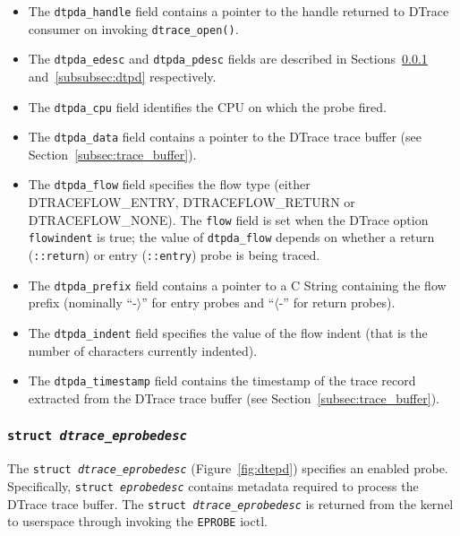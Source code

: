 \begin{itemize}

	\item The \texttt{dtpda\_handle} field contains a pointer to the handle
returned to DTrace consumer on invoking \texttt{dtrace\_open()}.

	\item The \texttt{dtpda\_edesc} and \texttt{dtpda\_pdesc} fields are
described in Sections~\ref{subsubsec:dtepd} and~\ref{subsubsec:dtpd}
respectively.

	\item The \texttt{dtpda\_cpu} field identifies the CPU on which the
probe fired.

	\item The \texttt{dtpda\_data} field contains a pointer to the DTrace
trace buffer (see Section~\ref{subsec:trace_buffer}).

	\item The \texttt{dtpda\_flow} field specifies the flow type (either
DTRACEFLOW\_ENTRY, DTRACEFLOW\_RETURN or DTRACEFLOW\_NONE). The \texttt{flow}
field is set when the DTrace option \texttt{flowindent} is true; the value of
\texttt{dtpda\_flow} depends on whether a return (\texttt{::return}) or entry
(\texttt{::entry}) probe is being traced.

	\item The \texttt{dtpda\_prefix} field contains a pointer to a C String
containing the flow prefix (nominally ``-$\rangle$'' for entry probes and
``$\langle$-'' for return probes).

	\item The \texttt{dtpda\_indent} field specifies the value of the flow
indent (that is the number of characters currently indented).

	\item The \texttt{dtpda\_timestamp} field contains the timestamp of the
trace record extracted from the DTrace trace buffer (see
Section~\ref{subsec:trace_buffer}).

\end{itemize}

\subsubsection{\texttt{struct \textit{dtrace\_eprobedesc}}}
\label{subsubsec:dtepd}

The \texttt{struct~\textit{dtrace\_eprobedesc}} (Figure~\ref{fig:dtepd})
specifies an enabled probe. Specifically, \texttt{struct~\textit{eprobedesc}}
contains metadata required to process the DTrace trace buffer. The
\texttt{struct~\textit{dtrace\_eprobedesc}} is returned from the kernel to
userspace through invoking the \texttt{EPROBE} ioctl.

